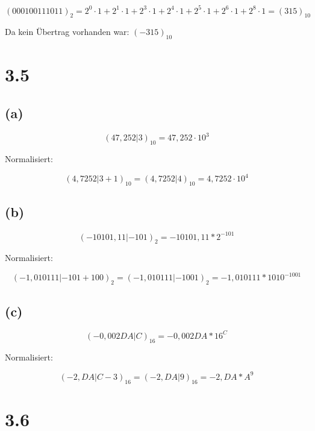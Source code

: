 \documentclass[11pt,a4paper]{article}
\begin{document}
$(000100111011)_2 = 2^{0} \cdot 1 + 2^{1} \cdot 1 + 2^{3} \cdot 1 + 2^{4} \cdot 1 + 2^{5} \cdot 1 + 2^{6} \cdot 1 + 2^{8} \cdot 1 = (315)_{10}$

Da kein Übertrag vorhanden war: $(-315)_10$

\newpage
\section*{3.5}
\label{sec:3.5}



\subsection*{(a)}
\begin{equation*}
(47,252 | 3)_{10} = 47,252 \cdot 10^3
\end{equation*}

Normalisiert:

\begin{equation*}
(4,7252 | 3+1 )_{10} = (4,7252 | 4 )_{10} = 4,7252 \cdot 10^4
\end{equation*}

\subsection*{(b)}
\begin{equation*}
(-10101,11 | -101)_2 = -10101,11*2^{-101}
\end{equation*}

Normalisiert:

\begin{equation*}
(-1,010111 | -101+100)_2 = (-1,010111 | -1001)_2 = -1,010111*1010^{-1001}
\end{equation*}

\subsection*{(c)}
\begin{equation*}
(-0,002DA | C)_{16} = -0,002DA*16^C
\end{equation*}

Normalisiert:

\begin{equation*}
(-2,DA |C-3)_{16}=(-2,DA |9)_{16}=-2,DA*A^9
\end{equation*}

\section*{3.6}
\label{sec:3.6}
\end{document}
